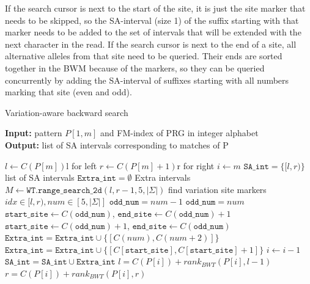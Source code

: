 \documentclass[runningheads,a4paper]{llncs}
\begin{document}
If the search cursor is next to the start of the site, it is just the site marker that needs to be skipped, so the SA-interval (size 1) of the suffix starting with that marker needs to be added to the set of intervals that will be extended with the next character in the read. If the search cursor is next to the end of a site, all alternative alleles from that site need to be queried. Their ends are sorted together in the BWM because of the markers, so they can be queried concurrently by adding the SA-interval of suffixes starting with all numbers marking that site (even and odd). 



\begin{algorithm}
\caption{Variation-aware backward search} \label{bsearch}
\textbf{Input:} \textrm{pattern} $P[1,m]$ \textrm{and FM-index of PRG in integer alphabet}\\
\textbf{Output:} \textrm{list of SA intervals corresponding to matches of P} 
\begin{algorithmic}[1]
\State $l \gets C(P[m])$\Comment l for left
\State $r \gets C(P[m]+1)$\Comment r for right
\State $i \gets m$
\State $\texttt{SA\char`_int}=\{[l,r)\}$ \Comment list of SA intervals
\State $\texttt{Extra\char`_int}=\emptyset$   \Comment Extra intervals
\ForAll {$[l,r) \in \texttt{SA\char`_int}$} 
\State $M \gets \texttt{WT.range\char`_search\char`_2d} (l,r-1,5,|\Sigma|)$ \Comment find variation site markers
  \Comment $ idx\in [l,r), num\in[5,|\Sigma|]$
\State $\texttt{odd\char`_num}=num-1$
\Else
\State $\texttt{odd\char`_num}=num$
\EndIf
{}
\State $\texttt{start\char`_site} \gets C(\texttt{odd\char`_num})$, $\texttt{end\char`_site} \gets C(\texttt{odd\char`_num})+1$
\Else 
\State $\texttt{start\char`_site} \gets C(\texttt{odd\char`_num})+1$, $\texttt{end\char`_site} \gets C(\texttt{odd\char`_num})$
\EndIf
{}
\State $\texttt{Extra\char`_int}=\texttt{Extra\char`_int} \cup \{[C(num),C(num+2)]\}$
\Else
\State $\texttt{Extra\char`_int}=\texttt{Extra\char`_int} \cup \{[C[\texttt{start\char`_site}], C[\texttt{start\char`_site}]+1]\}$
\EndIf
\EndFor
\EndFor
\State $i \gets i-1$
\State $\texttt{SA\char`_int}=\texttt{SA\char`_int} \cup \texttt{Extra\char`_int}$
\ForAll {$[l,r) \in \texttt{SA\char`_int}$} 
\State $l=C(P[i])+rank_{BWT}(P[i],l-1)$
\State $r=C(P[i])+rank_{BWT}(P[i],r)$
\EndFor
\EndWhile
\end {algorithmic}
\end{algorithm}
\end{document}
